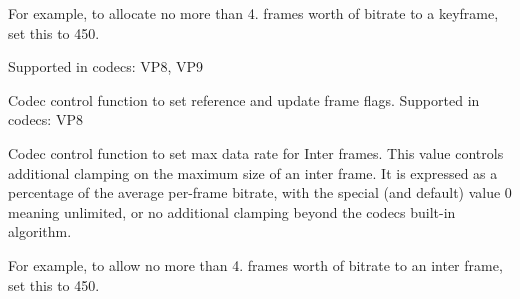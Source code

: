 \begin{Desc}
\begin{description}
For example, to allocate no more than 4. frames worth of bitrate to a keyframe, set this to 450.

Supported in codecs\+: V\+P8, V\+P9 \item[{\em 
V\+P8\+E\+\_\+\+S\+E\+T\+\_\+\+F\+R\+A\+M\+E\+\_\+\+F\+L\+A\+GS\hypertarget{group__vp8__encoder_gga6deae3d561c838952552c3d3756322ecad8a730e3be2912848ac97b651680dc14}{}\label{group__vp8__encoder_gga6deae3d561c838952552c3d3756322ecad8a730e3be2912848ac97b651680dc14}
}]Codec control function to set reference and update frame flags. Supported in codecs\+: V\+P8 \item[{\em 
V\+P9\+E\+\_\+\+S\+E\+T\+\_\+\+M\+A\+X\+\_\+\+I\+N\+T\+E\+R\+\_\+\+B\+I\+T\+R\+A\+T\+E\+\_\+\+P\+CT\hypertarget{group__vp8__encoder_gga6deae3d561c838952552c3d3756322eca05c677432387056a74b92d0546c80fd4}{}\label{group__vp8__encoder_gga6deae3d561c838952552c3d3756322eca05c677432387056a74b92d0546c80fd4}
}]Codec control function to set max data rate for Inter frames. This value controls additional clamping on the maximum size of an inter frame. It is expressed as a percentage of the average per-\/frame bitrate, with the special (and default) value 0 meaning unlimited, or no additional clamping beyond the codec\textquotesingle{}s built-\/in algorithm.

For example, to allow no more than 4. frames worth of bitrate to an inter frame, set this to 450.


\end{description}
\end{Desc}
